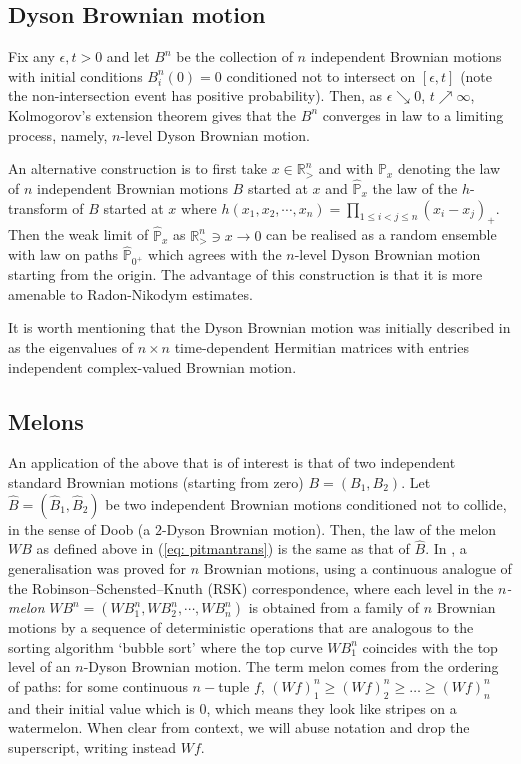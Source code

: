 \documentclass[11pt, reqno]{amsart}
\numberwithin{equation}{section}
\newcommand{\R}{\ensuremath{\mathbb{R}}}
\newcommand{\PP}{\ensuremath{\mathbb{P}}}
\begin{document}
\subsection{Dyson Brownian motion} 

Fix any $\epsilon, t > 0$ and let $B^n$ be the collection of $n$ independent Brownian motions with initial conditions $B^n_i(0) = 0$ conditioned not to intersect on $[\epsilon, t]$ (note the non-intersection event has positive probability). Then, as $\epsilon \searrow 0$, $t \nearrow \infty$, Kolmogorov's extension theorem gives that the $B^n$ converges in law to a limiting process, namely, $n$-level Dyson Brownian motion.

An alternative construction is to first take $x\in \R^n_{>}$ and with $ \PP_x$ denoting the law of $n$ independent Brownian motions $B$ started at $x$ and $\hat{\PP}_x$ the law of the $h$-transform of $B$ started at $x$ where $h(x_1, x_2, \cdots, x_n) = \prod_{1\le i < j\le n}(x_i-x_j)_+$. Then the weak limit of $\hat{\PP}_x$ as $\R^n_> \ni x \to 0$ can be realised as a random ensemble with law on paths $\hat{\PP}_{0^+}$ which agrees with the $n$-level Dyson Brownian motion starting from the origin. The advantage of this construction is that it is more amenable to Radon-Nikodym estimates.

It is worth mentioning that the Dyson Brownian motion was initially described in \cite{dyson1962brownian} as the eigenvalues of $n \times n$ time-dependent Hermitian matrices with entries independent complex-valued Brownian motion. 

\subsection{Melons}\label{subsec: melons}An application of the above that is of interest is that of two independent standard Brownian motions (starting from zero) \(B = (B_1, B_2)\).  Let \(\hat{B}=(\hat{B}_1, \hat{B}_2)\) be two independent Brownian motions conditioned not to collide, in the sense of Doob (a $2$-Dyson Brownian motion). Then, the law of the melon \(WB\) as defined above in (\ref{eq: pitmantrans}) is the same as that of \(\hat{B}\). In \cite{O2002representation}, a generalisation was proved for \(n\) Brownian motions, using a continuous analogue of the Robinson–Schensted–Knuth (RSK) correspondence, where each level in the \textit{$n$-melon} $WB^n = (WB^n_1, WB^n_2, \cdots, WB^n_n)$ is obtained from a family of $n$ Brownian motions by a sequence of deterministic operations that are analogous to the sorting algorithm `bubble sort' where the top curve $WB^n_1$ coincides with the top level of an $n$-Dyson Brownian motion. The term melon comes from the ordering of paths: for some continuous $n-$tuple $f$, $(Wf)^n_1 \ge (Wf)^n_2 \ge \dots \ge (Wf)^n_n$ and their initial value which is $0$, which means they look like stripes on a watermelon. When clear from context, we will abuse notation and drop the superscript, writing instead $Wf$. 
\end{document}

